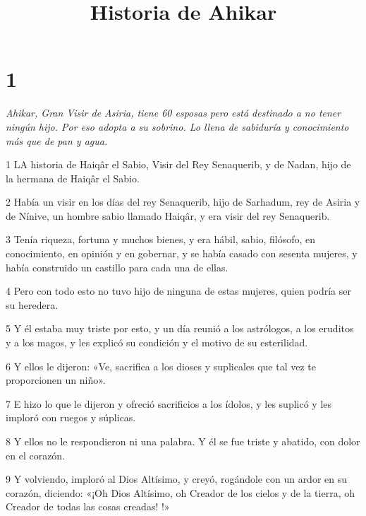 

\title{Historia de Ahikar}

\chapter{1}

\par \textit{Ahikar, Gran Visir de Asiria, tiene 60 esposas pero está destinado a no tener ningún hijo. Por eso adopta a su sobrino. Lo llena de sabiduría y conocimiento más que de pan y agua.}

\par 1 LA historia de Haiqâr el Sabio, Visir del Rey Senaquerib, y de Nadan, hijo de la hermana de Haiqâr el Sabio.

\par 2 Había un visir en los días del rey Senaquerib, hijo de Sarhadum, rey de Asiria y de Nínive, un hombre sabio llamado Haiqâr, y era visir del rey Senaquerib.

\par 3 Tenía riqueza, fortuna y muchos bienes, y era hábil, sabio, filósofo, en conocimiento, en opinión y en gobernar, y se había casado con sesenta mujeres, y había construido un castillo para cada una de ellas.

\par 4 Pero con todo esto no tuvo hijo de ninguna de estas mujeres, quien podría ser su heredera.

\par 5 Y él estaba muy triste por esto, y un día reunió a los astrólogos, a los eruditos y a los magos, y les explicó su condición y el motivo de su esterilidad.

\par 6 Y ellos le dijeron: «Ve, sacrifica a los dioses y suplicales que tal vez te proporcionen un niño».

\par 7 E hizo lo que le dijeron y ofreció sacrificios a los ídolos, y les suplicó y les imploró con ruegos y súplicas.

\par 8 Y ellos no le respondieron ni una palabra. Y él se fue triste y abatido, con dolor en el corazón.

\par 9 Y volviendo, imploró al Dios Altísimo, y creyó, rogándole con un ardor en su corazón, diciendo: «¡Oh Dios Altísimo, oh Creador de los cielos y de la tierra, oh Creador de todas las cosas creadas! !»

